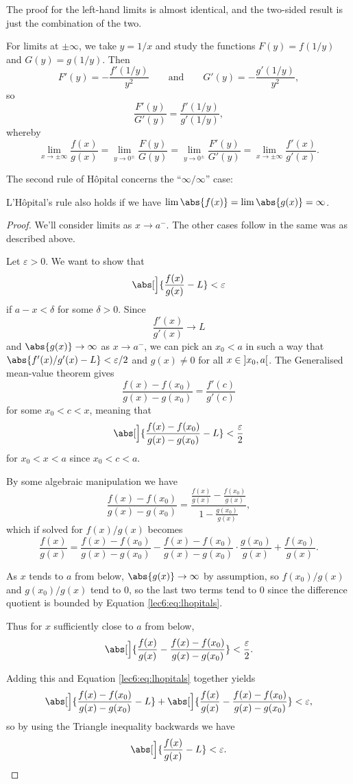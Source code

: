 \noindent
The proof for the left-hand limits is almost identical, and the two-sided result is just the combination of the two.

For limits at $\pm\infty$, we take $y = 1/x$ and study the functions $F(y) = f(1/y)$ and $G(y) = g(1/y)$.
Then
\[
	F'(y) = - \frac{f'(1/y)}{y^2} \qquad \text{and} \qquad G'(y) = - \frac{g'(1 / y)}{y^2},
\]
so
\[
	\frac{F'(y)}{G'(y)} = \frac{f'(1/y)}{g'(1/y)},
\]
whereby
\[
	\lim_{x \to \pm\infty} \frac{f(x)}{g(x)} = \lim_{y \to 0^\pm} \frac{F(y)}{G(y)} = \lim_{y \to 0^\pm} \frac{F'(y)}{G'(y)} = \lim_{x \to \pm\infty} \frac{f'(x)}{g'(x)}.
\]

\noindent
The second rule of H\^{o}pital concerns the ``$\infty / \infty$'' case:

\begin{theorem}
	L'H\^{o}pital's rule also holds if we have $\lim \abs{f(x)} = \lim \abs{g(x)} = \infty$.
\end{theorem}

\begin{proof}
	We'll consider limits as $x \to a^-$.
	The other cases follow in the same was as described above.

	Let $\varepsilon > 0$.
	We want to show that
	\[
		\abs[\Big]{\frac{f(x)}{g(x)} - L} < \varepsilon
	\]
	if $a - x < \delta$ for some $\delta > 0$.
	Since
	\[
		\frac{f'(x)}{g'(x)} \to L
	\]
	and $\abs{g(x)} \to \infty$ as $x \to a^-$, we can pick an $x_0 < a$ in such a way that $\abs{f'(x) / g'(x) - L} < \varepsilon/2$ and $g(x) \neq 0$ for all $x \in \interval[open]{x_0}{a}$.
	The Generalised mean-value theorem gives
	\[
		\frac{f(x) - f(x_0)}{g(x) - g(x_0)} = \frac{f'(c)}{g'(c)}
	\]
	for some $x_0 < c < x$, meaning that
	\begin{equation}\label{lec6:eq:lhopitals}
		\abs[\Big]{\frac{f(x) - f(x_0)}{g(x) - g(x_0)} - L} < \frac{\varepsilon}{2}
	\end{equation}
	for $x_0 < x < a$ since $x_0 < c < a$.

	By some algebraic manipulation we have
	\[
		\frac{f(x) - f(x_0)}{g(x) - g(x_0)} = \frac{\frac{f(x)}{g(x)} - \frac{f(x_0)}{g(x)}}{1 - \frac{g(x_0)}{g(x)}},
	\]
	which if solved for $f(x)/g(x)$ becomes
	\[
		\frac{f(x)}{g(x)} = \frac{f(x) - f(x_0)}{g(x) - g(x_0)} - \frac{f(x) - f(x_0)}{g(x) - g(x_0)} \cdot \frac{g(x_0)}{g(x)} + \frac{f(x_0)}{g(x)}.
	\]

	\noindent
	As $x$ tends to $a$ from below, $\abs{g(x)} \to \infty$ by assumption, so $f(x_0) / g(x)$ and $g(x_0) / g(x)$ tend to $0$, so the last two terms tend to $0$ since the difference quotient is bounded by Equation \eqref{lec6:eq:lhopitals}.

	Thus for $x$ sufficiently close to $a$ from below,
	\[
		\abs[\Big]{\frac{f(x)}{g(x)} - \frac{f(x) - f(x_0)}{g(x) - g(x_0)}} < \frac{\varepsilon}{2}.
	\]

	\noindent
	Adding this and Equation \eqref{lec6:eq:lhopitals} together yields
	\[
		\abs[\Big]{\frac{f(x) - f(x_0)}{g(x) - g(x_0)} - L} + \abs[\Big]{\frac{f(x)}{g(x)} - \frac{f(x) - f(x_0)}{g(x) - g(x_0)}}  < \varepsilon,
	\]
	so by using the Triangle inequality backwards we have
	\[
		\abs[\Big]{\frac{f(x)}{g(x)} - L} < \varepsilon. \qedhere
	\]
\end{proof}
